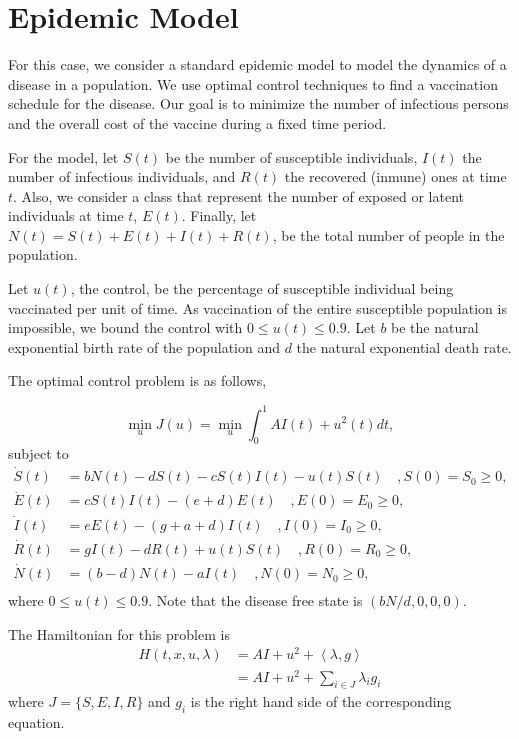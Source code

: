 \section{Epidemic Model} %

For this case, we consider a standard epidemic model to model the dynamics of a disease in a population. We use optimal control techniques to find a vaccination
schedule for the disease. Our goal is to minimize the number of infectious persons and the overall cost of the vaccine during a fixed time period. 

For the model, let $S(t)$ be the number of susceptible individuals, $I(t)$ the
number of infectious individuals, and $R(t)$ the recovered (inmune) ones at time
$t$. Also, we consider a class that represent the number of exposed or latent
individuals at time $t$, $E(t)$. Finally, let $N(t) = S(t) + E(t) + I(t) +R (t)$,
be the total number of people in the population.

Let $u(t)$, the control, be the percentage of susceptible individual being 
vaccinated per unit of time. As vaccination of the entire susceptible population
is impossible, we bound the control with $0 \leq u(t) \leq 0.9$. Let $b$ be the
natural exponential birth rate of the population and $d$ the natural exponential
death rate. 

The optimal control problem is as follows,

$$
    \min_{u} J(u) = \min_{u} \int_{0}^{1} AI(t) + u^{2}(t) dt,
$$
subject to
\begin{align*}
    \dot{S}(t) &=
        bN(t) - dS(t) - cS(t)I(t) - u(t)S(t) \quad, S(0) = S_0 \geq 0,   \\
    \dot{E}(t) &=
        cS(t)I(t) - (e + d)E(t) \quad, E(0) = E_0 \geq 0,    \\
    \dot{I}(t) &=
        eE(t) - (g + a +d)I(t) \quad, I(0) = I_0 \geq 0,     \\
    \dot{R}(t) &=
        gI(t) -dR(t) + u(t)S(t) \quad, R(0) = R_0 \geq 0,    \\
    \dot{N}(t) &=
        (b - d)N(t) - aI(t) \quad, N(0) = N_0 \geq 0,        \\
\end{align*}
where $0 \leq u(t) \leq 0.9$. Note that the disease free state is $(bN/d,0,0,0)$.

The Hamiltonian for this problem is
\begin{align*}
    H(t,x,u,\lambda) &= AI + u^{2} + \left< \lambda , g \right> \\
                     &= AI + u^{2} + \sum_{i \in J} \lambda_{i}g_{i}
\end{align*}
where $J = \{S, E, I, R\}$ and $g_i$ is the right hand side of the corresponding
equation.

